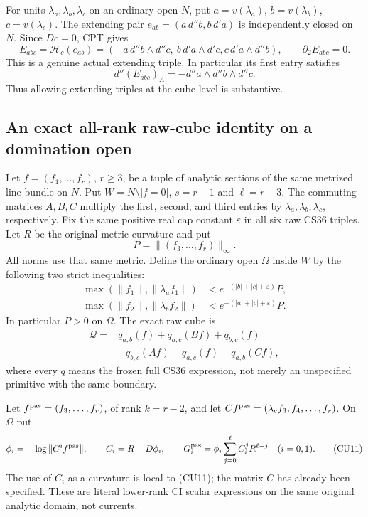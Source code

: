 For units $\lambda_a,\lambda_b,\lambda_c$ on an ordinary open $N$,
put $a=v(\lambda_a)$, $b=v(\lambda_b)$, $c=v(\lambda_c)$.
The extending pair $e_{ab}=(a\,d''b,b\,d'a)$ is independently
closed on $N$.  Since $Dc=0$, CPT gives
\[
 E_{abc}=\mathcal H_c(e_{ab})
     =(-a\,d''b\wedge d''c,\ b\,d'a\wedge d'c,
                                      c\,d'a\wedge d''b),
       \qquad \partial_2 E_{abc}=0.
 \tag{CU6}
\]
This is a genuine actual extending triple.  In particular its first
entry satisfies
\[
                 d''(E_{abc})_A=-d''a\wedge d''b\wedge d''c.
 \tag{CU7}
\]
Thus allowing extending triples at the cube level is substantive.

\subsection{An exact all-rank raw-cube identity on a domination open}

Let $f=(f_1,\ldots,f_r)$, $r\ge3$, be a tuple of analytic sections
of the same metrized line bundle on $N$.  Put $W=N\setminus|f=0|$,
$s=r-1$ and $\ell=r-3$.  The commuting matrices $A,B,C$ multiply
the first, second, and third entries by $\lambda_a,\lambda_b,
\lambda_c$, respectively.  Fix the same positive real cap constant
$\varepsilon$ in all six raw CS36 triples.  Let $R$ be the original
metric curvature and put
\[
                P=\|(f_3,\ldots,f_r)\|_\infty.
 \tag{CU8}
\]
All norms use that same metric.  Define the ordinary open $\Omega$
inside $W$ by the following two strict inequalities:
\[
 \begin{split}
 \max(\|f_1\|,\|\lambda_a f_1\|)
                   &<e^{-(|b|+|c|+\varepsilon)}P,\\
 \max(\|f_2\|,\|\lambda_b f_2\|)
                   &<e^{-(|a|+|c|+\varepsilon)}P.
 \end{split}
 \tag{CU9}
\]
In particular $P>0$ on $\Omega$.  The exact raw cube is
\[
 \begin{split}
 \mathcal Q={}&q_{a,b}(f)+q_{a,c}(Bf)+q_{b,c}(f)\\
              &-q_{b,c}(Af)-q_{a,c}(f)-q_{a,b}(Cf),
 \end{split}
 \tag{CU10}
\]
where every $q$ means the frozen full CS36 expression, not merely
an unspecified primitive with the same boundary.

Let $f^{\rm pas}=(f_3,\ldots,f_r)$, of rank $k=r-2$, and let
$Cf^{\rm pas}=(\lambda_cf_3,f_4,\ldots,f_r)$.  On $\Omega$ put
\[
 \phi_i=-\log\|C^i f^{\rm pas}\|,\qquad
 C_i=R-D\phi_i,\qquad
 G_i^{\rm pas}=\phi_i\sum_{j=0}^{\ell} C_i^jR^{\ell-j}
                         \quad(i=0,1).
 \tag{CU11}
\]
The use of $C_i$ as a curvature is local to (CU11); the matrix $C$
has already been specified.  These are literal lower-rank CI scalar
expressions on the same original analytic domain, not currents.

